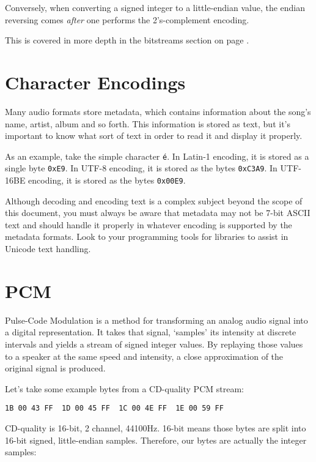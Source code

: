 Conversely, when converting a signed integer to a little-endian value,
the endian reversing comes \textit{after} one performs the
2's-complement encoding.

This is covered in more depth in the bitstreams section
on page \pageref{bitstreams}.

\section{Character Encodings}

Many audio formats store metadata, which contains information about
the song's name, artist, album and so forth.
This information is stored as text, but it's important to know what
sort of text in order to read it and display it properly.

As an example, take the simple character \texttt{\'e}.
In Latin-1 encoding, it is stored as a single byte \texttt{0xE9}.
In UTF-8 encoding, it is stored as the bytes \texttt{0xC3A9}.
In UTF-16BE encoding, it is stored as the bytes \texttt{0x00E9}.

Although decoding and encoding text is a complex subject beyond
the scope of this document, you must always be aware that
metadata may not be 7-bit ASCII text and should handle
it properly in whatever encoding is supported by the metadata
formats.
Look to your programming tools for libraries to assist in Unicode
text handling.

\pagebreak

\section {PCM}

Pulse-Code Modulation is a method for transforming an analog
audio signal into a digital representation.
It takes that signal, `samples' its intensity at
discrete intervals and yields a stream of signed integer
values.
By replaying those values to a speaker at the same
speed and intensity, a close approximation of the
original signal is produced.

Let's take some example bytes from a CD-quality PCM stream:

\begin{Verbatim}[frame=single]
1B 00 43 FF  1D 00 45 FF  1C 00 4E FF  1E 00 59 FF
\end{Verbatim}

CD-quality is 16-bit, 2 channel, 44100Hz.
16-bit means those bytes are split into 16-bit signed, little-endian samples.
Therefore, our bytes are actually the integer samples:

